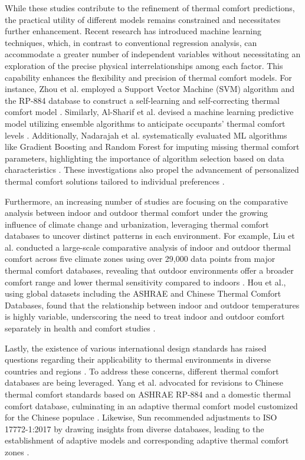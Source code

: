 \documentclass[final,3p,times,12pt]{elsarticle}
\begin{document}
While these studies contribute to the refinement of thermal comfort predictions, the practical utility of different models remains constrained and necessitates further enhancement. Recent research has introduced machine learning techniques, which, in contrast to conventional regression analysis, can accommodate a greater number of independent variables without necessitating an exploration of the precise physical interrelationships among each factor. This capability enhances the flexibility and precision of thermal comfort models. For instance, Zhou et al. employed a Support Vector Machine (SVM) algorithm and the RP-884 database to construct a self-learning and self-correcting thermal comfort model \cite{zhouDatadrivenThermalComfort2020}. Similarly, Al-Sharif et al. devised a machine learning predictive model utilizing ensemble algorithms to anticipate occupants' thermal comfort levels \cite{al-sharifPredictingThermalPreferences2024}. Additionally, Nadarajah et al. systematically evaluated ML algorithms like Gradient Boosting and Random Forest for imputing missing thermal comfort parameters, highlighting the importance of algorithm selection based on data characteristics \cite{nadarajahIdentificationApplicationBestsuited2024}. These investigations also propel the advancement of personalized thermal comfort solutions tailored to individual preferences \cite{arakawamartinsSystematicReviewPersonal2022}. 

Furthermore, an increasing number of studies are focusing on the comparative analysis between indoor and outdoor thermal comfort under the growing influence of climate change and urbanization, leveraging thermal comfort databases to uncover distinct patterns in each environment. For example, Liu et al. conducted a large-scale comparative analysis of indoor and outdoor thermal comfort across five climate zones using over 29,000 data points from major thermal comfort databases, revealing that outdoor environments offer a broader comfort range and lower thermal sensitivity compared to indoors \cite{liuComparativeAnalysisIndoor2022a}. Hou et al., using global datasets including the ASHRAE and Chinese Thermal Comfort Databases, found that the relationship between indoor and outdoor temperatures is highly variable, underscoring the need to treat indoor and outdoor comfort separately in health and comfort studies \cite{houTemporalSpatialHeterogeneity2023}. 

Lastly, the existence of various international design standards has raised questions regarding their applicability to thermal environments in diverse countries and regions \cite{bemaInvestigationASHRAEGlobal2023,lourenconizaThermalComfortConditions2022}. To address these concerns, different thermal comfort databases are being leveraged. Yang et al. advocated for revisions to Chinese thermal comfort standards based on ASHRAE RP-884 and a domestic thermal comfort database, culminating in an adaptive thermal comfort model customized for the Chinese populace \cite{yangComparativeAnalysisIndoor2024}. Likewise, Sun recommended adjustments to ISO 17772-1:2017 by drawing insights from diverse databases, leading to the establishment of adaptive models and corresponding adaptive thermal comfort zones \cite{sunRevisitingAdaptiveThermal2024}.
\end{document}
